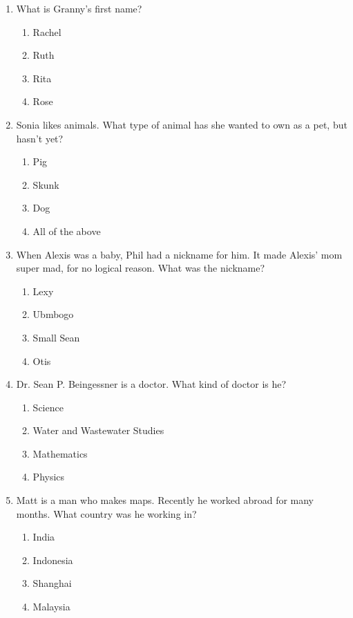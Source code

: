 \documentclass[11pt]{exam}
\begin{document}
\begin{questions}
\begin{enumerate}
\item What is Granny’s first name?

\begin{enumerate}
\item{} Rachel
\item{} Ruth
\item{} Rita
\item{} Rose
\end{enumerate}


\item Sonia likes animals. What type of animal has she wanted to own as a pet, but hasn’t yet?

\begin{enumerate}
\item{} Pig
\item{} Skunk
\item{} Dog
\item{} All of the above
\end{enumerate}


\item When Alexis was a baby, Phil had a nickname for him. It made Alexis’ mom super mad, for no
logical reason. What was the nickname?

\begin{enumerate}
\item{} Lexy
\item{} Ubmbogo
\item{} Small Sean
\item{} Otis
\end{enumerate}


\item Dr. Sean P. Beingessner is a doctor. What kind of doctor is he?

\begin{enumerate}
\item{} Science
\item{} Water and Wastewater Studies
\item{} Mathematics
\item{} Physics
\end{enumerate}


\item Matt is a man who makes maps. Recently he worked abroad for many months. What country
was he working in?

\begin{enumerate}
\item{} India
\item{} Indonesia
\item{} Shanghai
\item{} Malaysia
\end{enumerate}



\end{enumerate}
\end{questions}
\end{document}

